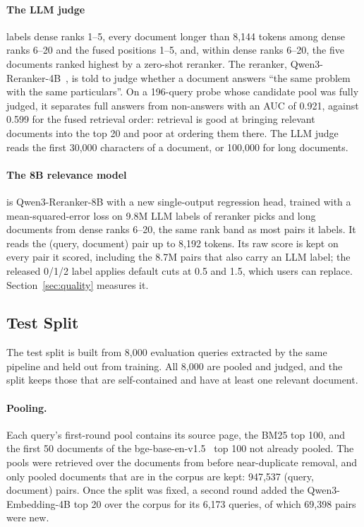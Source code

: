 \paragraph{The LLM judge} labels dense ranks 1--5, every document longer than 8,144 tokens among dense ranks 6--20 and the fused positions 1--5, and, within dense ranks 6--20, the five documents ranked highest by a zero-shot reranker. The reranker, Qwen3-Reranker-4B~\citep{zhang2025qwen3embedding}, is told to judge whether a document answers ``the same problem with the same particulars''. On a 196-query probe whose candidate pool was fully judged, it separates full answers from non-answers with an AUC of 0.921, against 0.599 for the fused retrieval order: retrieval is good at bringing relevant documents into the top 20 and poor at ordering them there. The LLM judge reads the first 30,000 characters of a document, or 100,000 for long documents.

\paragraph{The 8B relevance model} is Qwen3-Reranker-8B with a new single-output regression head, trained with a mean-squared-error loss on 9.8M LLM labels of reranker picks and long documents from dense ranks 6--20, the same rank band as most pairs it labels. It reads the (query, document) pair up to 8,192 tokens. Its raw score is kept on every pair it scored, including the 8.7M pairs that also carry an LLM label; the released 0/1/2 label applies default cuts at 0.5 and 1.5, which users can replace. Section~\ref{sec:quality} measures it.

\subsection{Test Split}
\label{sec:test}

The test split is built from 8,000 evaluation queries extracted by the same pipeline and held out from training. All 8,000 are pooled and judged, and the split keeps those that are self-contained and have at least one relevant document.

\paragraph{Pooling.}
Each query's first-round pool contains its source page, the BM25 top 100, and the first 50 documents of the bge-base-en-v1.5~\citep{xiao2024cpack} top 100 not already pooled. The pools were retrieved over the documents from before near-duplicate removal, and only pooled documents that are in the corpus are kept: 947,537 (query, document) pairs. Once the split was fixed, a second round added the Qwen3-Embedding-4B top 20 over the corpus for its 6,173 queries, of which 69,398 pairs were new.

